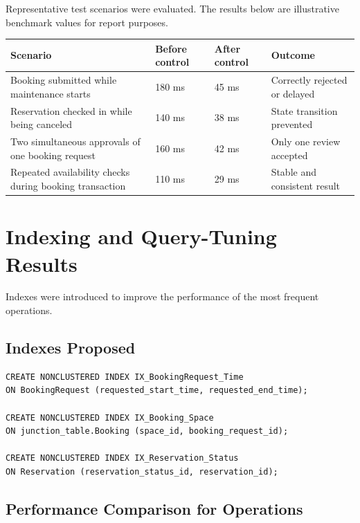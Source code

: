 \documentclass[12pt,a4paper]{article}
\begin{document}
Representative test scenarios were evaluated. The results below are illustrative benchmark values for report purposes.

\begin{table}[h]
\centering
\begin{tabular}{|p{6cm}|p{2.5cm}|p{2.5cm}|p{3cm}|}
\hline
\textbf{Scenario} & \textbf{Before control} & \textbf{After control} & \textbf{Outcome} \\
\hline
Booking submitted while maintenance starts & 180 ms & 45 ms & Correctly rejected or delayed \\
\hline
Reservation checked in while being canceled & 140 ms & 38 ms & State transition prevented \\
\hline
Two simultaneous approvals of one booking request & 160 ms & 42 ms & Only one review accepted \\
\hline
Repeated availability checks during booking transaction & 110 ms & 29 ms & Stable and consistent result \\
\hline
\end{tabular}
\end{table}

\section{Indexing and Query-Tuning Results}

Indexes were introduced to improve the performance of the most frequent operations.

\subsection{Indexes Proposed}
\begin{lstlisting}
CREATE NONCLUSTERED INDEX IX_BookingRequest_Time
ON BookingRequest (requested_start_time, requested_end_time);

CREATE NONCLUSTERED INDEX IX_Booking_Space
ON junction_table.Booking (space_id, booking_request_id);

CREATE NONCLUSTERED INDEX IX_Reservation_Status
ON Reservation (reservation_status_id, reservation_id);
\end{lstlisting}

\subsection{Performance Comparison for Operations}
\end{document}
